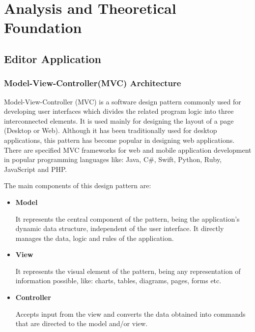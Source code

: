 \documentclass[12pt,a4paper,twoside]{report}
\begin{document}
\chapter{Analysis and Theoretical Foundation}
\section{Editor Application}
\subsection{Model-View-Controller(MVC) Architecture}

Model-View-Controller (MVC) is a software design pattern commonly used for developing user interfaces which divides the related program logic into three interconnected elements. It is used mainly for designing the layout of a page (Desktop or Web). Although it has been traditionally used for desktop applications, this pattern has become popular in designing web applications. There are specified MVC frameworks for web and mobile application development in popular programming languages like: Java, C\#, Swift, Python, Ruby, JavaScript and PHP.


The main components of this design pattern are:

\begin{itemize}
\item \textbf{Model}
		
It represents the central component of the pattern, being the application's dynamic data structure, independent of the user interface. It directly manages the data, logic and rules of the application.

\item \textbf{View}

It represents the visual element of the pattern, being any representation of information possible, like: charts, tables, diagrams, pages, forms etc. 

\item \textbf{Controller}

Accepts input from the view and converts the data obtained into commands that are directed to the model and/or view.
\end{itemize}
\end{document}
